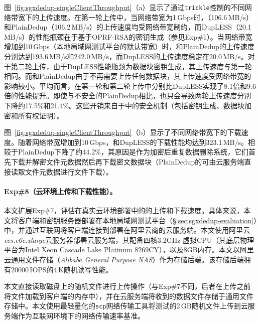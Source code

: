 图~\ref{fig:sgxdedup-singleClientThroughput}（a）显示了通过{\tt trickle}\cite{eriksen05}控制的不同网络带宽下的上传速度。在第一轮上传中，当网络带宽为1\,Gbps时，\sysnameS （106.6\,MB/s）和PlainDedup（106.2\,MB/s）的上传速度均受网络带宽制约，而DupLESS（20.1\,MB/s）的性能瓶颈在于基于OPRF-RSA的密钥生成（参见Exp\#1）。当网络带宽增加到10\,Gbps（本地局域网测试平台的默认带宽）时，\sysnameS 和PlainDedup的上传速度分别达到193.6\,MB/s和242.0\,MB/s，而DupLESS的上传速度稳定在20.0\,MB/s。对于第二轮上传，由于DupLESS性能瓶颈为数据块密钥生成，其上传速度与第一轮相同。而\sysnameS 和PlainDedup由于不再需要上传任何数据块，其上传速度受网络带宽的影响较小。平均而言，\sysnameS 在第一轮和第二轮上传中分别比DupLESS实现了8.1倍和9.6倍的性能提升。即使与不安全的PlainDedup相比，\sysnameS 也只会导致两轮上传速度分别下降约17.5\%和21.4\%。这些开销来自于\sysnameS 中的安全机制（包括密钥生成、数据块加密和所有权证明）。

图~\ref{fig:sgxdedup-singleClientThroughput}（b）显示了不同网络带宽下的下载速度。随着网络带宽增加到10\,Gbps，\sysnameS 和DupLESS的下载性能均达到323.1\,MB/s。相较于PlainDedup下降了约44.2\%，其原因是作为加密后重复数据删除系统，它们首先下载并解密文件元数据然后再下载密文数据块（PlainDedup的可由云服务端直接读取文件元数据进行文件下载）。

\paragraph*{Exp\#8（云环境上传和下载性能）。}本文扩展Exp\#7，评估在真实云环境部署中的\sysnameS 的上传和下载速度。具体来说，本文将客户端和密钥服务器部署在本地局域网测试平台（\S\ref{sec:sgxdedup-evaluation}）中，并通过互联网将客户端连接到部署在阿里云商的云服务端。本文使用阿里云\textit{ecs.c6e.xlarge}云服务器部署云服务端，其配备四核3.2GHz 虚拟CPU（其底层物理平台为Intel Xeon Cascade Lake Platinum 8269CY），以及8GB内存。本文以阿里云通用文件存储（\textit{Alibaba General Purpose NAS}）作为存储后端。该存储后端拥有20000\,IOPS的4\,K随机读写性能。

本文直接读取磁盘上的随机文件进行上传操作（与Exp\#7不同，后者在上传之前将文件加载到客户端的内存中），并在云服务端将收到的数据文件存储于通用文件存储中。本文使用最轻量化的{\tt scp}网络传输工具将测试的2\,GB随机文件上传到云服务端作为互联网环境下的网络传输速率基准。

